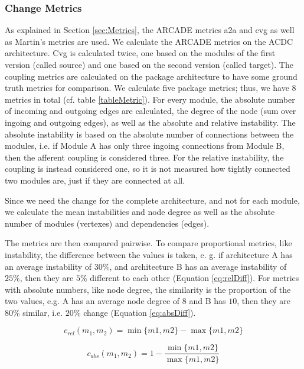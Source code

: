 \documentclass[conference]{IEEEtran}
\begin{document}
\subsubsection{Change Metrics}

As explained in Section \ref{sec:Metrics}, the ARCADE metrics a2a and cvg as well as Martin's metrics are used. We calculate the ARCADE metrics on the ACDC architecture. Cvg is calculated twice, one based on the modules of the first version (called source) and one based on the second version (called target).
The coupling metrics are calculated on the package architecture to have some ground truth metrics for comparison. We calculate five package metrics; thus, we have 8 metrics in total (cf. table \ref{tableMetric}).
For every module, the absolute number of incoming and outgoing edges are calculated, the degree of the node (sum over ingoing and outgoing edges), as well as the absolute and relative instability. The absolute instability is based on the absolute number of connections between the modules, i.e. if Module A has only three ingoing connections from Module B, then the afferent coupling is considered three. For the relative instability, the coupling is instead considered one, so it is not measured how tightly connected two modules are, just if they are connected at all.

Since we need the change for the complete architecture, and not for each module, we calculate the mean instabilities and node degree as well as the absolute number of modules (vertexes) and dependencies (edges).

The metrics are then compared pairwise. To compare proportional metrics, like instability, the difference between the values is taken, e. g. if architecture A has an average instability of $30\%$, and architecture B has an average instability of $25\%$, then they are $5\%$ different to each other (Equation \ref{eq:relDiff}). For metrics with absolute numbers, like node degree, the similarity is the proportion of the two values, e.g. A has an average node degree of $8$ and B has $10$, then they are $80\%$ similar, i.e. $20\%$ change (Equation \ref{eq:absDiff}).

\begin{equation} \label{eq:relDiff}
c_{rel}(m_1, m_2) =  \min\{m1, m2\} - \max\{m1, m2\}
\end{equation} 

\begin{equation} \label{eq:absDiff}
	c_{abs}(m_1, m_2) = 1 - \frac{\min\{m1, m2\}}{\max\{m1, m2\}}
\end{equation} 
\end{document}

